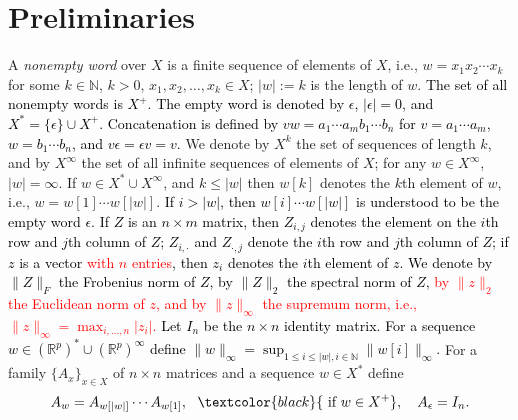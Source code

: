 \documentclass[journal,twoside,web]{ieeecolor}
\begin{document}
\section{Preliminaries}
 A \emph{nonempty word} over $X$ is a finite sequence of elements of $X$, i.e.,  
$w = x_{1}x_{2}\cdots x_{k}$ for some $k \in \mathbb{N}$, $k >0$, $x_{1}, x_{2}, \ldots, x_{k} \in X$; $|w|:=k$ is the 
length of $w$. \textcolor{black}{The set of all nonempty words is $X^{+}$. The empty word is denoted by $\epsilon$, $|\epsilon|=0$, and $X^{*} = \{\epsilon\} \cup X^{+}$. Concatenation is defined by $vw = a_1\cdots a_m b_1\cdots b_n$ for $v = a_1\cdots a_m$, $w = b_1\cdots b_n$, and $v\epsilon = \epsilon v = v$.}
We denote by $X^k$ the set of sequences of length $k$, and by $X^{\infty}$ the set of all infinite sequences of elements of $X$;
for any $w \in X^{\infty}$, $|w|=\infty$.
If $w \in X^{*} \cup X^{\infty}$, and $k \le |w|$ then $w[k]$ denotes the $k$th element of 
$w$, i.e., $w=w[1]\cdots w[|w|]$. \textcolor{black}{If $i > |w|$, then $w[i]\cdots w[|w|]$ is understood to be the empty word $\epsilon$.} 
	\textcolor{black}{If $Z$ is an $n \times m$ matrix, then $Z_{i,j}$ denotes the element on the $i$th row and $j$th column of $Z$; $Z_{i,\cdot}$ and $Z_{\cdot,j}$ denote the $i$th row and $j$th column of $Z$; if $z$ is a vector \textcolor{red}{with $n$ entries}, then $z_i$ denotes the $i$th element of $z$. 
We denote by $\|Z\|_F$ the Frobenius norm of $Z$, by $\|Z\|_2$ the spectral norm of $Z$,  \textcolor{red}{by $\|z\|_2$ the Euclidean norm of $z$, and 
by $\|z\|_{\infty}$ the supremum norm, i.e., $\|z\|_{\infty}=\max_{i,\ldots,n} |z_i|$.}  Let $I_n$ be the $n \times n$ identity matrix.}
\textcolor{black}{For a sequence $w \in (\mathbb{R}^p)^{*} \cup (\mathbb{R}^p)^{\infty}$ 
define  $\|w\|_{\infty} = \sup_{1 \le i \le |w|, i \in \mathbb{N}} \|w[i]\|_{\infty}$.}
For a  family $\{A_x\}_{x \in X}$ of $n \times n$ matrices 
and a sequence
$w  \in X^*$ define 
\[ A_{w} = A_{w[|w|]} \cdots A_{w[1]}, ~~\textcolor{black}{\mbox{ if } w \in X^{+}}, \quad A_{\epsilon}=I_n. \]

\end{document}
